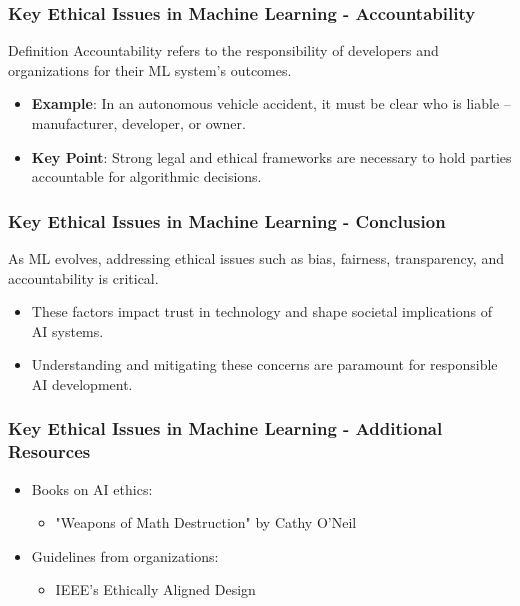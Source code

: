 \documentclass[aspectratio=169]{beamer}
\begin{document}
\begin{frame}[fragile]
  \frametitle{Key Ethical Issues in Machine Learning - Accountability}
  \begin{block}{Definition}
      Accountability refers to the responsibility of developers and organizations for their ML system's outcomes.
  \end{block}
  \begin{itemize}
      \item \textbf{Example}: In an autonomous vehicle accident, it must be clear who is liable – manufacturer, developer, or owner.
      \item \textbf{Key Point}: Strong legal and ethical frameworks are necessary to hold parties accountable for algorithmic decisions.
  \end{itemize}
\end{frame}

\begin{frame}[fragile]
  \frametitle{Key Ethical Issues in Machine Learning - Conclusion}
  As ML evolves, addressing ethical issues such as bias, fairness, transparency, and accountability is critical. 
  \begin{itemize}
      \item These factors impact trust in technology and shape societal implications of AI systems.
      \item Understanding and mitigating these concerns are paramount for responsible AI development.
  \end{itemize}
\end{frame}

\begin{frame}[fragile]
  \frametitle{Key Ethical Issues in Machine Learning - Additional Resources}
  \begin{itemize}
      \item Books on AI ethics: 
                \begin{itemize}
                    \item "Weapons of Math Destruction" by Cathy O'Neil
                \end{itemize}
      \item Guidelines from organizations: 
                \begin{itemize}
                    \item IEEE's Ethically Aligned Design
                \end{itemize}
  \end{itemize}
\end{frame}
\end{document}
